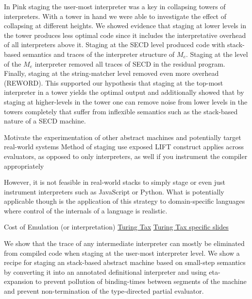 \documentclass[a4paper,12pt,twoside,openright]{report}
\theoremstyle{definition}
\newcommand{\mevl}{$M_{e}$}
\begin{document}
In Pink staging the user-most interpreter was a key in collapsing towers of interpreters. With a tower in hand we were able to investigate the effect of collapsing at different heights. We showed evidence that staging at lower levels in the tower produces less optimal code since it includes the interpretative overhead of all interpreters above it. Staging at the SECD level produced code with stack-based semantics and traces of the interpreter structure of \mevl. Staging at the level of the \mevl{} interpreter removed all traces of SECD in the residual program. Finally, staging at the string-matcher level removed even more overhead (REWORD). This supported our hypothesis that staging at the top-most interpreter in a tower yields the optimal output and additionally showed that by staging at higher-levels in the tower one can remove noise from lower levels in the towers completely that suffer from inflexible semantics such as the stack-based nature of a SECD machine.

Motivate the experimentation of other abstract machines and potentially target real-world systems
Method of staging use exposed LIFT construct applies across evaluators, as opposed to only interpreters, as well if you instrument the compiler appropriately

However, it is not feasible in real-world stacks to simply stage or even just instrument interpreters such as JavaScript or Python. What is potentially applicable though is the application of this strategy to domain-specific languages where control of the internals of a language is realistic.

Cost of Emulation (or interpretation)
\cite{steil2004dynamic}
\href{http://materials.dagstuhl.de/files/17/17061/17061.PaulH.J.Kelly.Slides.pdf}{Turing Tax}
\href{https://www.doc.ic.ac.uk/~phjk/AdvancedCompArchitecture/Lectures/pdfs/Ch01-TuringTaxDiscussionV02.pdf}{Turing Tax specific slides}


We show that the trace of any intermediate interpreter can mostly be eliminated from compiled code when staging at the user-most interpreter level. We show a recipe for staging an stack-based abstract machine based on small-step semantics by converting it into an annotated definitional interpreter and using eta-expansion to prevent pollution of binding-times between segments of the machine and prevent non-termination of the type-directed partial evaluator.
\end{document}
